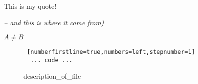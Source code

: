 \begin{description}[labelindent=1.53em] %
    \item[$^1$]
    \item[$^2$]
    \item[$^3$]
\end{description}

\begin{quoteit}
\large
This is my quote!
\end{quoteit}
\hfill \textit{-- and this is where it came from)}

$A \neq B$          %

\begin{figure}[H]
\begin{lstlisting} [numberfirstline=true,numbers=left,stepnumber=1]
  ... code ...
\end{lstlisting}
\caption*{description_of_file}
\label{code_label_of_file}
\end{figure}
